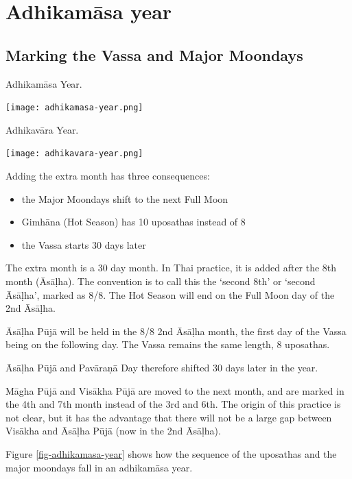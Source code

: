 \documentclass[11pt,oneside]{memoir-article}
\begin{document}
\clearpage

\section{Adhikamāsa year}
\label{sec-1-3}
\subsection{Marking the Vassa and Major Moondays}
\label{sec-1-3-1}
\label{marking-the-moondays-adhikamasa-year}

\begin{marginfigure}[-25mm]
\caption{\label{fig-adhikamasa-year} Adhikamāsa Year.}
\texttt{[image: adhikamasa-year.png]}
\end{marginfigure}

\begin{marginfigure}
\caption{\label{fig-adhikavara-year} Adhikavāra Year.}
\texttt{[image: adhikavara-year.png]}
\end{marginfigure}

Adding the extra month has three consequences:

\begin{itemize}
\item the Major Moondays shift to the next Full Moon
\item Gimhāna (Hot Season) has 10 uposathas instead of 8
\item the Vassa starts 30 days later
\end{itemize}

The extra month is a 30 day month. In Thai practice, it is added after the 8th
month (Āsāḷha). The convention is to call this the `second 8th' or `second
Āsāḷha', marked as 8/8. The Hot Season will end on the Full Moon day of the 2nd
Āsāḷha.

Āsāḷha Pūjā will be held in the 8/8 2nd Āsāḷha month, the first day of the
Vassa being on the following day. The Vassa remains the same length, 8 uposathas.

Āsāḷha Pūjā and Pavāraṇā Day therefore shifted 30 days later in the year.

Māgha Pūjā and Visākha Pūjā are moved to the next month, and are marked in the
4th and 7th month instead of the 3rd and 6th. The origin of this practice is not
clear, but it has the advantage that there will not be a large gap between
Visākha and Āsāḷha Pūjā (now in the 2nd Āsāḷha).


Figure \ref{fig-adhikamasa-year} shows how the sequence of the uposathas and the
major moondays fall in an adhikamāsa year.
\end{document}
